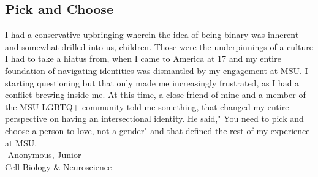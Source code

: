 \subsection*{Pick and Choose}
I had a conservative upbringing wherein the idea of being binary was inherent
and somewhat drilled into us, children. Those were the underpinnings of a 
culture I had to take a hiatus from, when I came to America at 17 and my entire 
foundation of navigating identities was dismantled by my engagement at MSU. I 
starting questioning but that only made me increasingly frustrated, as I had a 
conflict brewing inside me. At this time, a close friend of mine and a member 
of the MSU LGBTQ+ community told me something, that changed my entire 
perspective on having an intersectional identity. He said," You need to pick 
and choose a person to love, not a gender" and that defined the rest of my 
experience at MSU.
 \\
-Anonymous, Junior \\
Cell Biology \& Neuroscience\\

